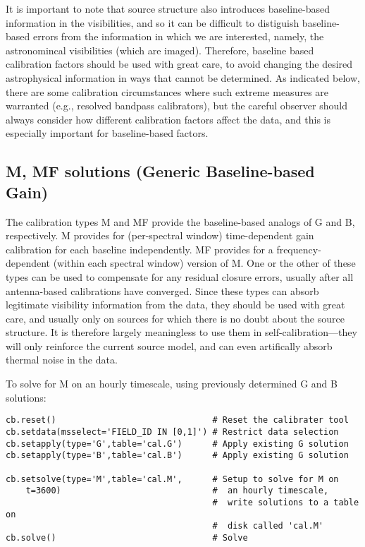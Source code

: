 It is important to note that source structure also introduces
baseline-based information in the visibilities, and so it can be
difficult to distiguish baseline-based errors from the information in
which we are interested, namely, the astronomincal visibilities (which
are imaged).  Therefore, baseline based calibration factors should be
used with great care, to avoid changing the desired astrophysical
information in ways that cannot be determined.  As indicated below,
there are some calibration circumstances where such extreme measures
are warranted (e.g., resolved bandpass calibrators), but the careful
observer should always consider how different calibration factors affect
the data, and this is especially important for baseline-based factors.

\subsection{M, MF solutions (Generic Baseline-based Gain)}
\label{section:caltool.BLcal.mmf}

The calibration types M and MF provide the baseline-based analogs
of G and B, respectively.  M provides for (per-spectral window)
time-dependent gain calibration for each baseline independently.  MF
provides for a frequency-dependent (within each spectral window)
version of M.  One or the other of these types can be used to
compensate for any residual closure errors, usually after all
antenna-based calibrations have converged.  Since these types can
absorb legitimate visibility information from the data, they should be
used with great care, and usually only on sources for which there is
no doubt about the source structure.  It is therefore largely
meaningless to use them in self-calibration---they will only reinforce
the current source model, and can even artifically absorb thermal
noise in the data.

To solve for M on an hourly timescale, using previously determined
G and B solutions:

\small
\begin{verbatim}
cb.reset()                               # Reset the calibrater tool
cb.setdata(msselect='FIELD_ID IN [0,1]') # Restrict data selection
cb.setapply(type='G',table='cal.G')      # Apply existing G solution
cb.setapply(type='B',table='cal.B')      # Apply existing G solution

cb.setsolve(type='M',table='cal.M',      # Setup to solve for M on
    t=3600)                              #  an hourly timescale,
                                         #  write solutions to a table on
                                         #  disk called 'cal.M'
cb.solve()                               # Solve
\end{verbatim}
\normalsize

